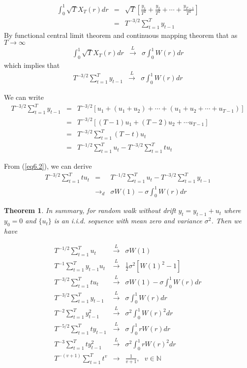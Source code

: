 \documentclass{article}
\newtheorem{theorem}{Theorem}
\begin{document}
\begin{eqnarray*}
\int_{0}^{1}\sqrt{T}X_{T}(r)dr&=&\sqrt{T}\left[\frac{y_{1}}{T^{2}}+\frac{y_{2}}{T^{2}}+\cdots+\frac{y_{T-1}}{T^{2}}\right]\\
						&=&T^{-3/2}\sum_{t=1}^{T}y_{t-1}
\end{eqnarray*}
By functional central limit theorem and continuous mapping theorem that as $T\to\infty$
\begin{eqnarray*}
\int_{0}^{1}\sqrt{T}X_{T}(r)dr&\xrightarrow{L}&\sigma\int_{0}^{1}W(r)dr
\end{eqnarray*}
which implies that
\begin{eqnarray}
\label{eq6.1}
T^{-3/2}\sum_{t=1}^{T}y_{t-1}&\xrightarrow{L}&\sigma\int_{0}^{1}W(r)dr
\end{eqnarray}

We can write
\begin{eqnarray}
\label{eq6.2}
\nonumber
T^{-3/2}\sum_{t=1}^{T}y_{t-1}&=&T^{-3/2}\left[u_{1}+(u_{1}+u_{2})+\cdots+(u_{1}+u_{2}+\cdots+u_{T-1})\right]\\\nonumber
	&=&T^{-3/2}\left[(T-1)u_{1}+(T-2)u_{2}+\cdots u_{T-1}\right]\\\nonumber
	&=&T^{-3/2}\sum_{t=1}^{T}(T-t)u_{t}\\
	&=&T^{-1/2}\sum_{t=1}^{T}u_{t}-T^{-3/2}\sum_{t=1}^{T}tu_{t}
\end{eqnarray}

From (\ref{eq6.2}), we can derive
\begin{eqnarray}
\label{eq6.3}
\nonumber
T^{-3/2}\sum_{t=1}^{T}tu_{t}&=&T^{-1/2}\sum_{t=1}^{T}u_{t}-T^{-3/2}\sum_{t=1}^{T}y_{t-1}\\
	&\to_{d}&\sigma W(1)-\sigma\int_{0}^{1}W(r)dr
\end{eqnarray}

\begin{theorem}
In summary, for random walk without drift $y_{t}=y_{t-1}+u_{t}$ where $y_{0}=0$ and $\{u_{t}\}$ is an i.i.d. sequence with mean zero and variance $\sigma^{2}$. Then we have

\begin{eqnarray}
\label{eq6.4}
T^{-1/2}\sum_{t=1}^{T}u_{t}&\xrightarrow{L}&\sigma W(1)\\
\label{eq6.5}
T^{-1}\sum_{t=1}^{T}y_{t-1}u_{t}&\xrightarrow{L}&\frac{1}{2}\sigma^{2} [W(1)^{2}-1]\\
\label{eq6.6}
T^{-3/2}\sum_{t=1}^{T}tu_{t}&\xrightarrow{L}&\sigma W(1)-\sigma\int_{0}^{1}W(r)dr\\
\label{eq6.7}
T^{-3/2}\sum_{t=1}^{T}y_{t-1}&\xrightarrow{L}&\sigma\int_{0}^{1}W(r)dr\\
\label{eq6.8}
T^{-2}\sum_{t=1}^{T}y_{t-1}^{2}&\xrightarrow{L}&\sigma^{2}\int_{0}^{1}W(r)^{2}dr\\
\label{eq6.9}
T^{-5/2}\sum_{t=1}^{T}ty_{t-1}&\xrightarrow{L}&\sigma\int_{0}^{1}rW(r)dr\\
\label{eq6.10}
T^{-3}\sum_{t=1}^{T}ty_{t-1}^{2}&\xrightarrow{L}&\sigma^{2}\int_{0}^{1}rW(r)^{2}dr\\
\label{eq6.11}
T^{-(v+1)}\sum_{t=1}^{T}t^{v}&\to&\frac{1}{v+1},\ \ \ v\in \mathbb{N}
\end{eqnarray}
\end{theorem}
\end{document}
